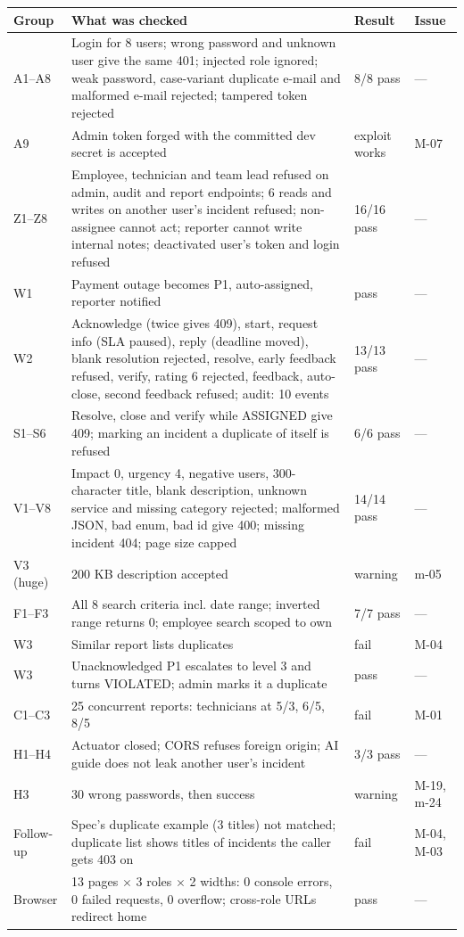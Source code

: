 \documentclass[11pt,a4paper]{article}
\begin{document}
{\small
\renewcommand{\arraystretch}{1.2}
\begin{longtable}{@{}P{1.6cm} P{9.4cm} P{1.4cm} P{3.0cm}@{}}
\toprule
\textbf{Group} & \textbf{What was checked} & \textbf{Result} & \textbf{Issue}\\
\midrule
\endhead
A1--A8 & Login for 8 users; wrong password and unknown user give the same 401; injected role ignored; weak password, case-variant duplicate e-mail and malformed e-mail rejected; tampered token rejected & 8/8 pass & ---\\
A9 & Admin token forged with the committed dev secret is accepted & \textcolor{sevC}{exploit works} & M-07\\
Z1--Z8 & Employee, technician and team lead refused on admin, audit and report endpoints; 6 reads and writes on another user's incident refused; non-assignee cannot act; reporter cannot write internal notes; deactivated user's token and login refused & 16/16 pass & ---\\
W1 & Payment outage becomes P1, auto-assigned, reporter notified & pass & ---\\
W2 & Acknowledge (twice gives 409), start, request info (SLA paused), reply (deadline moved), blank resolution rejected, resolve, early feedback refused, verify, rating 6 rejected, feedback, auto-close, second feedback refused; audit: 10 events & 13/13 pass & ---\\
S1--S6 & Resolve, close and verify while ASSIGNED give 409; marking an incident a duplicate of itself is refused & 6/6 pass & ---\\
V1--V8 & Impact 0, urgency 4, negative users, 300-character title, blank description, unknown service and missing category rejected; malformed JSON, bad enum, bad id give 400; missing incident 404; page size capped & 14/14 pass & ---\\
V3 (huge) & 200 KB description accepted & \textcolor{sevm}{warning} & m-05\\
F1--F3 & All 8 search criteria incl. date range; inverted range returns 0; employee search scoped to own & 7/7 pass & ---\\
W3 & Similar report lists duplicates & \textcolor{sevC}{fail} & M-04\\
W3 & Unacknowledged P1 escalates to level 3 and turns VIOLATED; admin marks it a duplicate & pass & ---\\
C1--C3 & 25 concurrent reports: technicians at 5/3, 6/5, 8/5 & \textcolor{sevC}{fail} & M-01\\
H1--H4 & Actuator closed; CORS refuses foreign origin; AI guide does not leak another user's incident & 3/3 pass & ---\\
H3 & 30 wrong passwords, then success & \textcolor{sevm}{warning} & M-19, m-24\\
Follow-up & Spec's duplicate example (3 titles) not matched; duplicate list shows titles of incidents the caller gets 403 on & \textcolor{sevC}{fail} & M-04, M-03\\
Browser & 13 pages $\times$ 3 roles $\times$ 2 widths: 0 console errors, 0 failed requests, 0 overflow; cross-role URLs redirect home & pass & ---\\
\bottomrule
\end{longtable}}
\end{document}
